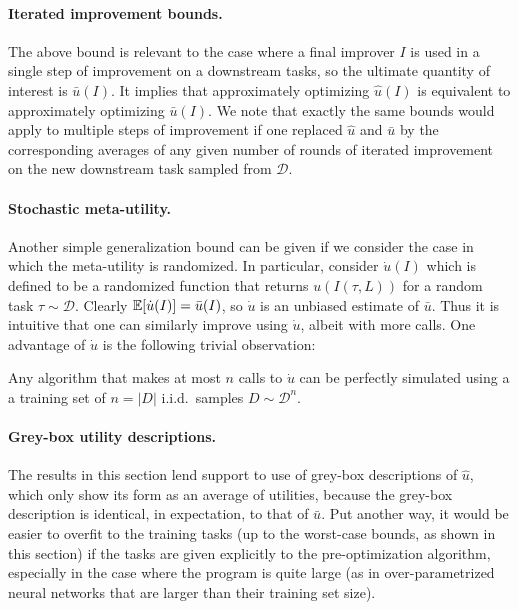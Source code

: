 \documentclass{article} %
\newcommand{\metautil}{{\hat{u}}}
\newcommand{\exputil}{{\bar{u}}}
\newcommand{\randutil}{{\dot{u}}}
\newcommand{\D}{{\mathcal{D}}}
\begin{document}
\paragraph{Iterated improvement bounds.} The above bound is relevant to the case where a final improver $I$ is used in a single step of improvement on a downstream tasks, so the ultimate quantity of interest is $\exputil(I)$. It implies that approximately optimizing $\metautil(I)$ is equivalent to approximately optimizing $\exputil(I)$. We note that exactly the same bounds would apply to multiple steps of improvement if one replaced $\metautil$ and $\exputil$ by the corresponding averages of any given number of rounds of iterated improvement on the new downstream task sampled from $\D$. 

\paragraph{Stochastic meta-utility.} Another simple generalization bound can be given if we consider the case in which the meta-utility is randomized. In particular, consider $\randutil(I)$ which is defined to be a randomized function that returns $u(I(\tau, L))$ for a random task $\tau \sim \D$. Clearly $\E[\randutil(I)]=\exputil(I)$, so $\randutil$ is an unbiased estimate of $\exputil$. Thus it is intuitive that one can similarly improve using $\randutil$, albeit with more calls. One advantage of $\randutil$ is the following trivial observation:
\begin{observation}
    Any algorithm that makes at most $n$ calls to $\randutil$ can be perfectly simulated using a a training set of $n=|D|$ i.i.d.\ samples $D \sim \D^n$.
\end{observation}

\paragraph{Grey-box utility descriptions.} The results in this section lend support to use of grey-box descriptions of $\metautil$, which only show its form as an average of utilities, because the grey-box description is identical, in expectation, to that of $\exputil$. Put another way, it would be easier to overfit to the training tasks (up to the worst-case bounds, as shown in this section) if the tasks are given explicitly to the pre-optimization algorithm, especially in the case where the program is quite large (as in over-parametrized neural networks that are larger than their training set size).
\end{document}
